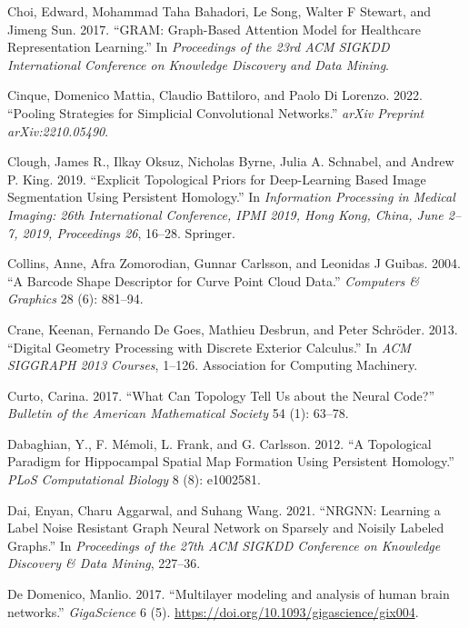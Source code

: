 \documentclass[
  12pt,
]{krantz}
\newlength{\cslhangindent}
\newenvironment{CSLReferences}[2] %
 {\begin{list}{}{%
  \setlength{\itemindent}{0pt}
  \setlength{\leftmargin}{0pt}
  \setlength{\parsep}{0pt}
  \ifodd #1
   \setlength{\leftmargin}{\cslhangindent}
   \setlength{\itemindent}{-1\cslhangindent}
  \fi
  \setlength{\itemsep}{#2\baselineskip}}}
 {\end{list}}
\begin{document}
\begin{CSLReferences}{1}{0}
Choi, Edward, Mohammad Taha Bahadori, Le Song, Walter F Stewart, and
Jimeng Sun. 2017. {``{GRAM}: Graph-Based Attention Model for Healthcare
Representation Learning.''} In \emph{Proceedings of the 23rd ACM SIGKDD
International Conference on Knowledge Discovery and Data Mining}.

Cinque, Domenico Mattia, Claudio Battiloro, and Paolo Di Lorenzo. 2022.
{``Pooling Strategies for Simplicial Convolutional Networks.''}
\emph{arXiv Preprint arXiv:2210.05490}.

Clough, James R., Ilkay Oksuz, Nicholas Byrne, Julia A. Schnabel, and
Andrew P. King. 2019. {``Explicit Topological Priors for Deep-Learning
Based Image Segmentation Using Persistent Homology.''} In
\emph{Information Processing in Medical Imaging: 26th International
Conference, IPMI 2019, Hong Kong, China, June 2--7, 2019, Proceedings
26}, 16--28. Springer.

Collins, Anne, Afra Zomorodian, Gunnar Carlsson, and Leonidas J Guibas.
2004. {``A Barcode Shape Descriptor for Curve Point Cloud Data.''}
\emph{Computers \& Graphics} 28 (6): 881--94.

Crane, Keenan, Fernando De Goes, Mathieu Desbrun, and Peter Schröder.
2013. {``Digital Geometry Processing with Discrete Exterior Calculus.''}
In \emph{ACM SIGGRAPH 2013 Courses}, 1--126. Association for Computing
Machinery.

Curto, Carina. 2017. {``What Can Topology Tell Us about the Neural
Code?''} \emph{Bulletin of the American Mathematical Society} 54 (1):
63--78.

Dabaghian, Y., F. Mémoli, L. Frank, and G. Carlsson. 2012. {``A
Topological Paradigm for Hippocampal Spatial Map Formation Using
Persistent Homology.''} \emph{PLoS Computational Biology} 8 (8):
e1002581.

Dai, Enyan, Charu Aggarwal, and Suhang Wang. 2021. {``{NRGNN}: Learning
a Label Noise Resistant Graph Neural Network on Sparsely and Noisily
Labeled Graphs.''} In \emph{Proceedings of the 27th ACM SIGKDD
Conference on Knowledge Discovery \& Data Mining}, 227--36.

De Domenico, Manlio. 2017. {``{Multilayer modeling and analysis of human
brain networks}.''} \emph{GigaScience} 6 (5).
\url{https://doi.org/10.1093/gigascience/gix004}.


\end{CSLReferences}
\end{document}
